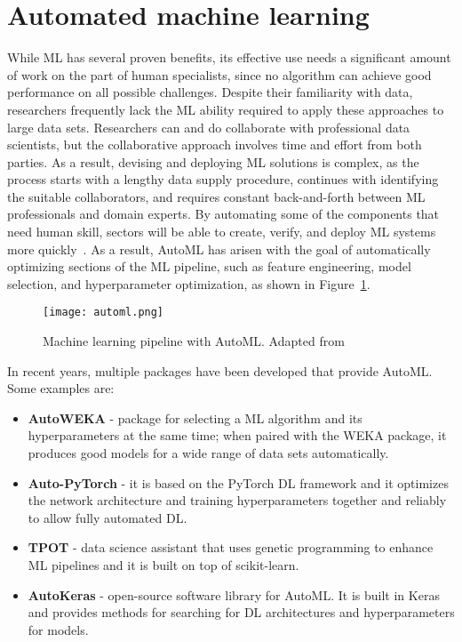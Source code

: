 \section{Automated machine learning}

While \gls{ML} has several proven benefits, its effective use needs a significant amount of work on the part of human specialists, since no algorithm can achieve good performance on all possible challenges. Despite their familiarity with data, researchers frequently lack the \gls{ML} ability required to apply these approaches to large data sets. Researchers can and do collaborate with professional data scientists, but the collaborative approach involves time and effort from both parties. As a result, devising and deploying \gls{ML} solutions is complex, as the process starts with a lengthy data supply procedure, continues with identifying the suitable collaborators, and requires constant back-and-forth between \gls{ML} professionals and domain experts. By automating some of the components that need human skill, sectors will be able to create, verify, and deploy \gls{ML} systems more quickly~\cite{Waring2020AutomatedHealthcare}. As a result, \gls{AutoML} has arisen with the goal of automatically optimizing sections of the \gls{ML} pipeline, such as feature engineering, model selection, and hyperparameter optimization, as shown in Figure~\ref{fig:automl}. 

\begin{figure}[htbp]
    \centering
    \texttt{[image: automl.png]}
    \caption{Machine learning pipeline with AutoML. Adapted from~\cite{Waring2020AutomatedHealthcare}}
    \label{fig:automl}
\end{figure}

In recent years, multiple packages have been developed that provide \gls{AutoML}. Some examples are:

\begin{itemize}
    \item \textbf{AutoWEKA} - package for selecting a \gls{ML} algorithm and its hyperparameters at the same time; when paired with the WEKA package, it produces good models for a wide range of data sets automatically.
    
    \item \textbf{Auto-PyTorch} - it is based on the PyTorch \gls{DL} framework and it optimizes the network architecture and training hyperparameters together and reliably to allow fully automated \gls{DL}.
    
    \item \textbf{TPOT} - data science assistant that uses genetic programming to enhance \gls{ML} pipelines and it is built on top of scikit-learn.
    
    \item \textbf{AutoKeras} - open-source software library for \gls{AutoML}. It is built in Keras and provides methods for searching for \gls{DL} architectures and hyperparameters for models. 
    
\end{itemize}


